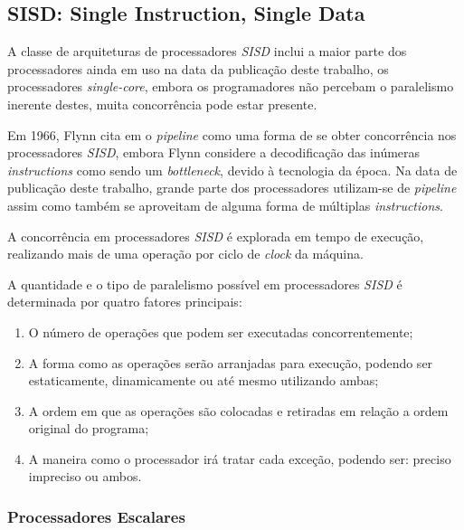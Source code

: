\subsection{SISD: Single Instruction, Single Data}

A classe de arquiteturas de processadores \textit{SISD} inclui a 
maior parte dos processadores ainda em uso na data da publicação deste trabalho, 
os processadores 
\textit{single-core}, embora os programadores não percebam o paralelismo 
inerente destes, muita concorrência pode estar presente.  

Em 1966, Flynn cita em \cite{Flynn:1996} o \textit{pipeline} como uma forma de 
se obter concorrência 
nos processadores \textit{SISD}, embora Flynn considere a decodificação das 
inúmeras \textit{instructions} como sendo um \textit{bottleneck}, devido à 
tecnologia da época. 
Na data de publicação deste trabalho, grande parte dos processadores 
utilizam-se de \textit{pipeline} assim como também se aproveitam de alguma forma 
de múltiplas \textit{instructions}.

A concorrência em processadores \textit{SISD} é explorada em tempo de execução,
realizando mais de uma operação por ciclo de \textit{clock} da máquina.

A quantidade e o tipo de paralelismo possível em processadores \textit{SISD}
é determinada por quatro fatores principais:

\begin{enumerate}
        \item O número de operações que podem ser executadas concorrentemente;
        \item A forma como as operações serão arranjadas para execução,
                podendo ser estaticamente, dinamicamente ou até mesmo utilizando
                ambas;
        \item A ordem em que as operações são colocadas e retiradas em relação
                a ordem original do programa;
        \item A maneira como o processador irá tratar cada exceção, podendo ser: 
                preciso impreciso ou ambos.
\end{enumerate}

\subsubsection{Processadores Escalares}

